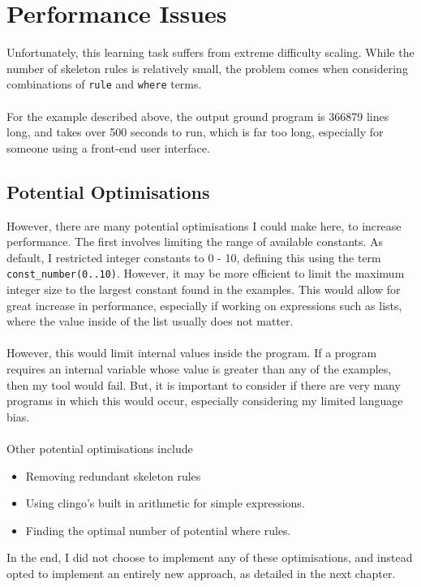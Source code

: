 \section{Performance Issues}
Unfortunately, this learning task suffers from extreme difficulty scaling. While the number of skeleton rules is relatively small, the problem comes when considering combinations of \lstinline{rule} and \lstinline{where} terms.\\ \\ %
For the example described above, the output ground program is 366879 lines long, and takes over 500 seconds to run, which is far too long, especially for someone using a front-end user interface.

\subsection{Potential Optimisations}
However, there are many potential optimisations I could make here, to increase performance. The first involves limiting the range of available constants. As default, I restricted integer constants to 0 - 10, defining this using the term \lstinline{const_number(0..10)}. However, it may be more efficient to limit the maximum integer size to the largest constant found in the examples. This would allow for great increase in performance, especially if working on expressions such as lists, where the value inside of the list usually does not matter. \\ \\ %
However, this would limit internal values inside the program. If a program requires an internal variable whose value is greater than any of the examples, then my tool would fail. But, it is important to consider if there are very many programs in which this would occur, especially considering my limited language bias. \\ \\
Other potential optimisations include
\begin{itemize}
\item Removing redundant skeleton rules
\item Using clingo's built in arithmetic for simple expressions.
\item Finding the optimal number of potential where rules.
\end{itemize}
In the end, I did not choose to implement any of these optimisations, and instead opted to implement an entirely new approach, as detailed in the next chapter.

\pagebreak
%
%